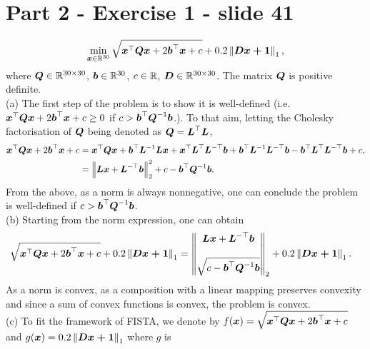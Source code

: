 \section{Part 2 - Exercise 1 - slide 41}
%
\begin{equation*}
    \min_{\boldsymbol x \in \mathbb{R}^{30}} \sqrt{\boldsymbol x^\top \boldsymbol{Qx} + 
    2 \boldsymbol b^\top \boldsymbol x + c} + 0.2 \left\lVert\boldsymbol{Dx+\boldsymbol 1}\right\rVert_{1},
\end{equation*}
%
where $\boldsymbol Q \in \mathbb{R}^{30\times 30}$, $\boldsymbol b\in \mathbb{R}^{30}$, $c\in \mathbb{R}$, $\boldsymbol D
\in \mathbb{R}^{30\times 30}$. The matrix $\boldsymbol Q$ is positive definite. \\

\indent (a) The first step of the problem is to show it is well-defined (i.e. $\boldsymbol x^\top \boldsymbol{Qx} + 
2 \boldsymbol b^\top \boldsymbol x + c\geq 0$ if $c> \boldsymbol b^\top\boldsymbol Q^{-1} \boldsymbol b$.). To that aim, letting the Cholesky factorisation of $\boldsymbol Q$ being denoted as $\boldsymbol Q = \boldsymbol L^\top \boldsymbol L$, 
\begin{align*}
	\boldsymbol x^\top \boldsymbol{Qx} + 
2 \boldsymbol b^\top \boldsymbol x + c &= \boldsymbol x^\top \boldsymbol{Qx} + \boldsymbol b^\top \boldsymbol L^{-1} \boldsymbol{Lx} + \boldsymbol x^\top \boldsymbol L^\top \boldsymbol L^{-\top} \boldsymbol b + \boldsymbol b^{\top} \boldsymbol L^{-1} \boldsymbol L^{-\top} \boldsymbol b - \boldsymbol b^\top \boldsymbol L^\top \boldsymbol L^{-\top} \boldsymbol b + c,\\
&= \left \| \boldsymbol{Lx} + \boldsymbol L^{-\top} \boldsymbol b \right \|_2^2 + c -\boldsymbol b^\top\boldsymbol Q^{-1} \boldsymbol b. 
\end{align*}  
From the above, as a norm is always nonnegative, one can conclude the problem is well-defined if $c> \boldsymbol b^\top\boldsymbol Q^{-1} \boldsymbol b$.   \\
%
\indent (b) Starting from the norm expression, one can obtain 
\begin{align*}
	\sqrt{\boldsymbol x^\top \boldsymbol{Qx} + 
    2 \boldsymbol b^\top \boldsymbol x + c} + 0.2 \left\lVert\boldsymbol{Dx+\boldsymbol 1}\right\rVert_{1} &= \left \| \begin{matrix}
    \boldsymbol{Lx} + \boldsymbol L^{-\top} \boldsymbol b \\
    \\
    \sqrt{c -\boldsymbol b^\top\boldsymbol Q^{-1} \boldsymbol b}
    \end{matrix} \right \|_2 + 0.2 \left\lVert\boldsymbol{Dx+\boldsymbol 1}\right\rVert_{1}. 
\end{align*}
As a norm is convex, as a composition with a  linear mapping preserves convexity and since a sum of convex functions is convex, the problem is convex. \\
\indent (c) To fit the framework of FISTA,  we denote by $f(\boldsymbol x) = \sqrt{\boldsymbol x^\top \boldsymbol{Qx} + 
2 \boldsymbol b^\top \boldsymbol x + c}$ and $g(\boldsymbol x) =  0.2 \left\lVert\boldsymbol{Dx+\boldsymbol 1}\right\rVert_{1}$ where $g$ is 
